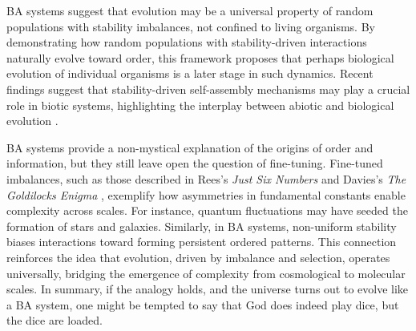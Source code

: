 \documentclass[entropy,article,submit,pdftex,moreauthors]{Definitions/mdpi}
\begin{document}
BA systems suggest that evolution may be a universal property of random populations with stability imbalances, not confined to living organisms. By demonstrating how random populations with stability-driven interactions naturally evolve toward order, this framework proposes that perhaps biological evolution of individual organisms is a later stage in such dynamics. Recent findings suggest that stability-driven self-assembly mechanisms may play a crucial role in biotic systems, highlighting the interplay between abiotic and biological evolution \cite{davies2022selfassembly}.

BA systems provide a non-mystical explanation of the origins of order and information, but they still leave open the question of fine-tuning. Fine-tuned imbalances, such as those described in Rees's \textit{Just Six Numbers} \cite{rees2000just} and Davies's \textit{The Goldilocks Enigma} \cite{davies2006goldilocks}, exemplify how asymmetries in fundamental constants enable complexity across scales. For instance, quantum fluctuations may have seeded the formation of stars and galaxies. Similarly, in BA systems,  non-uniform stability biases interactions toward forming persistent ordered patterns. This connection reinforces the idea that evolution, driven by imbalance and selection, operates universally, bridging the emergence of complexity from cosmological to molecular scales. In summary, if the analogy holds, and the universe turns out to evolve like a BA system, one might be tempted to say that God does indeed play dice, but the dice are loaded.



\vspace{6pt} 


\end{document}
